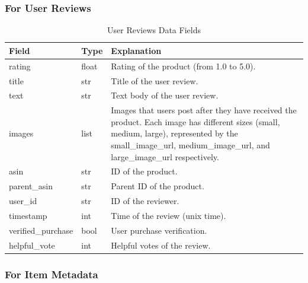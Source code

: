\documentclass{article}
\begin{document}
\subsubsection{For User Reviews}
\begin{table}[H]
      \centering
      \begin{tabular}{|l|l|p{8cm}|}
            \hline
            \textbf{Field}     & \textbf{Type} & \textbf{Explanation}
            \\ \hline
            rating             & float         & Rating of the product (from
            1.0 to
            5.0).
            \\ \hline
            title              & str           & Title of the user review.
            \\ \hline
            text               & str           & Text body of the user review.
            \\ \hline
            images             & list          & Images that users post after
            they
            have received the product.
            Each image has different sizes (small, medium, large), represented
            by
            the
            small\_image\_url, medium\_image\_url, and large\_image\_url
            respectively.
            \\
            \hline
            asin               & str           & ID of the product.
            \\ \hline
            parent\_asin       & str           & Parent ID of the product.
            \\ \hline
            user\_id           & str           & ID of the reviewer.
            \\ \hline
            timestamp          & int           & Time of the review (unix
            time).
            \\ \hline
            verified\_purchase & bool          & User purchase verification.
            \\ \hline
            helpful\_vote      & int           & Helpful votes of the review.
            \\ \hline
      \end{tabular}
      \caption{User Reviews Data Fields}
      \label{table:user_reviews}
\end{table}

\subsubsection{For Item Metadata}
\end{document}
